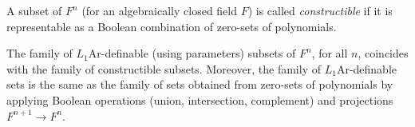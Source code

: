 A subset of $F^n$ (for an algebraically closed field $F$) is called \emph{constructible} if it is representable as a Boolean combination of zero-sets of polynomials.

The family of $L_1\text{Ar}$-definable (using parameters) subsets of $F^n$, for all $n$, coincides with the family of constructible subsets. Moreover, the family of $L_1\text{Ar}$-definable sets is the same as the family of sets obtained from zero-sets of polynomials by applying Boolean operations (union, intersection, complement) and projections $F^{n+1} \to F^n$.
